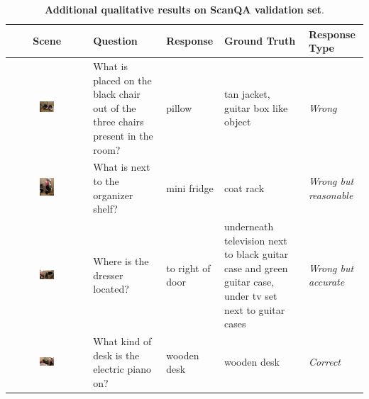 \begin{table}[t]
    \centering
    \caption{\textbf{Additional qualitative results on ScanQA validation set}.}
    \small
    \begin{tabular}{c|p{6em}|p{6em}|p{8em}|p{6em}}
    \toprule
         Scene  & Question & Response & Ground Truth & Response Type \\
         
         \midrule
         \raisebox{-1\height}
         {\includegraphics[width=0.2\textwidth, ]{figs/vis_scanqa_2.jpg}} & What is placed on the black chair out of the three chairs present in the room? & pillow & tan jacket, guitar box like object & \textit{Wrong} \\
         
         \midrule
         \raisebox{-1\height}
         {\includegraphics[width=0.2\textwidth, ]{figs/vis_scanqa_1.jpg}} & What is next to the organizer shelf? & mini fridge & coat rack & \textit{Wrong but reasonable} \\
         
         \midrule
         \raisebox{-1\height}
         {\includegraphics[width=0.2\textwidth, ]{figs/vis_scanqa_3.jpg}} & Where is the dresser located? &  to right of door &
         underneath television next to black guitar case and green guitar case, under tv set next to guitar cases & \textit{Wrong but accurate} \\

         \midrule
         \raisebox{-1\height}
         {\includegraphics[width=0.2\textwidth, ]{figs/vis_scanqa_4.jpg}} &
         What kind of desk is the electric piano on? &
         wooden desk & wooden desk & \textit{Correct} \\
        

\end{tabular}
\end{table}
